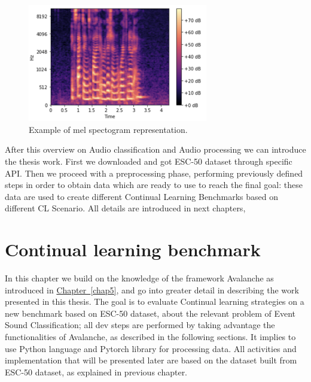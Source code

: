 \documentclass[english, LaM, oneside]{sapthesis}%
\begin{document}
\begin{figure}[h]
            \centering
            \includegraphics[width=0.70\textwidth]{mel-spectogram.png}
            \caption{Example of mel spectogram representation.}
            \label{fig:spectogram}
\end{figure}

After this overview on Audio classification and Audio processing we can introduce the thesis work.
First we downloaded and got ESC-50 dataset through specific API. Then we proceed with a preprocessing phase, performing previously defined steps in order to obtain data which are ready to use to reach the final goal: these data are used to create different Continual Learning Benchmarks based on different CL Scenario. All details are introduced in next chapters,

\chapter{Continual learning benchmark}
In this chapter we build on the knowledge of the framework Avalanche as introduced in \hyperref[chap5]{Chapter~\ref*{chap5}}, and go into greater detail in describing the work presented in this thesis.
The goal is to evaluate Continual learning strategies on a new benchmark based on ESC-50 dataset, about the relevant problem of Event Sound Classification; all dev steps are performed by taking advantage the functionalities of Avalanche, as described in the following sections. It implies to use Python language and Pytorch library for processing data. 
All activities and implementation that will be presented later are based on the dataset built from ESC-50 dataset, as explained in previous chapter.
\end{document}
